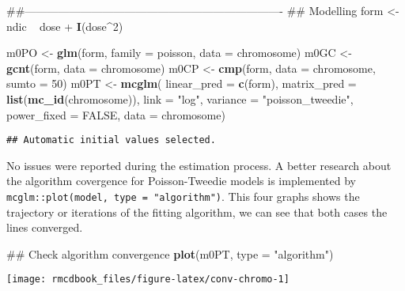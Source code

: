 \documentclass[9pt,a5paper,]{book}
\newenvironment{Shaded}{}{}
\newcommand{\KeywordTok}[1]{\textbf{{#1}}}
\newcommand{\DataTypeTok}[1]{\underline{{#1}}}
\newcommand{\DecValTok}[1]{{#1}}
\newcommand{\StringTok}[1]{{#1}}
\newcommand{\OtherTok}[1]{{#1}}
\newcommand{\NormalTok}[1]{{#1}}
\renewenvironment{Shaded}{\color{inputcolor}}{}
\renewcommand{\DataTypeTok}[1]{{#1}}
\theoremstyle{definition}
\theoremstyle{definition}
\theoremstyle{remark}
\begin{document}
\begin{Shaded}
\begin{Highlighting}[]
\NormalTok{##----------------------------------------------------------------------}
\NormalTok{## Modelling}
\NormalTok{form <-}\StringTok{ }\NormalTok{ndic ~}\StringTok{ }\NormalTok{dose +}\StringTok{ }\KeywordTok{I}\NormalTok{(dose^}\DecValTok{2}\NormalTok{)}

\NormalTok{m0PO <-}\StringTok{ }\KeywordTok{glm}\NormalTok{(form, }\DataTypeTok{family =} \NormalTok{poisson, }\DataTypeTok{data =} \NormalTok{chromosome)}
\NormalTok{m0GC <-}\StringTok{ }\KeywordTok{gcnt}\NormalTok{(form, }\DataTypeTok{data =} \NormalTok{chromosome)}
\NormalTok{m0CP <-}\StringTok{ }\KeywordTok{cmp}\NormalTok{(form, }\DataTypeTok{data =} \NormalTok{chromosome, }\DataTypeTok{sumto =} \DecValTok{50}\NormalTok{)}
\NormalTok{m0PT <-}\StringTok{ }\KeywordTok{mcglm}\NormalTok{(}
    \DataTypeTok{linear_pred =} \KeywordTok{c}\NormalTok{(form),}
    \DataTypeTok{matrix_pred =} \KeywordTok{list}\NormalTok{(}\KeywordTok{mc_id}\NormalTok{(chromosome)),}
    \DataTypeTok{link =} \StringTok{"log"}\NormalTok{,}
    \DataTypeTok{variance =} \StringTok{"poisson_tweedie"}\NormalTok{,}
    \DataTypeTok{power_fixed =} \OtherTok{FALSE}\NormalTok{,}
    \DataTypeTok{data =} \NormalTok{chromosome)}
\end{Highlighting}
\end{Shaded}

\begin{verbatim}
## Automatic initial values selected.
\end{verbatim}

No issues were reported during the estimation process. A better research
about the algorithm covergence for Poisson-Tweedie models is implemented
by \texttt{mcglm::plot(model,\ type\ =\ "algorithm")}. This four graphs
shows the trajectory or iterations of the fitting algorithm, we can see
that both cases the lines converged.

\begin{Shaded}
\begin{Highlighting}[]
\NormalTok{## Check algorithm convergence}
\KeywordTok{plot}\NormalTok{(m0PT, }\DataTypeTok{type =} \StringTok{"algorithm"}\NormalTok{)}
\end{Highlighting}
\end{Shaded}

\begin{center}\texttt{[image: rmcdbook\_files/figure-latex/conv-chromo-1]} \end{center}
\end{document}
